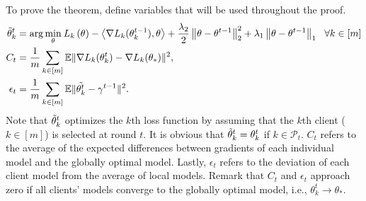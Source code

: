 \documentclass{article} %
\newtheorem{theorem}{Theorem}[section]
\begin{document}
To prove the theorem, define variables that will be used throughout the proof.
\begin{align}\label{tildetheta}
    \Tilde{\theta}_k^t &= \arg\underset{\theta}\min \: L_{k}\left ( \theta \right ) - \left< \nabla L_{k} (\theta_k^{t-1}), \theta\right> + \frac{\lambda_2}{2} \left\| \theta - \theta^{t-1}\right\|^{2}_{2}+ \lambda_1\left\|\theta - \theta^{t-1} \right\|_{1}\ \ \forall k \in [m] \\
\label{controlepsilon}
    C_t&=\frac{1}{m}\sum_{k\in [m]}\mathbb{E}\lVert \nabla L_k(\theta_k^t)-\nabla L_k(\theta_*) \rVert^2, \\
    \epsilon_t&=\frac{1}{m}\sum_{k\in[m]}\mathbb{E}\lVert \Tilde{\theta_k^t}-\gamma^{t-1} \rVert^2.
\end{align}
Note that $\Tilde{\theta}_k^t$ optimizes the $k$th loss function by assuming that the $k$th client ($k\in [m]$) is selected at round $t$. It is obvious that $\Tilde{\theta}_k^t = \theta_k^t$ if $k\in \mathcal{P}_t$. 
$C_t$ refers to the average of the expected differences between gradients of each individual model and the globally optimal model. Lastly, $\epsilon_t$ refers to the deviation of each client model from the average of local models. Remark that $C_t$ and $\epsilon_t$ approach zero if all clients' models converge to the globally optimal model, i.e., $\theta_k^t\rightarrow \theta_*$.

\end{document}

